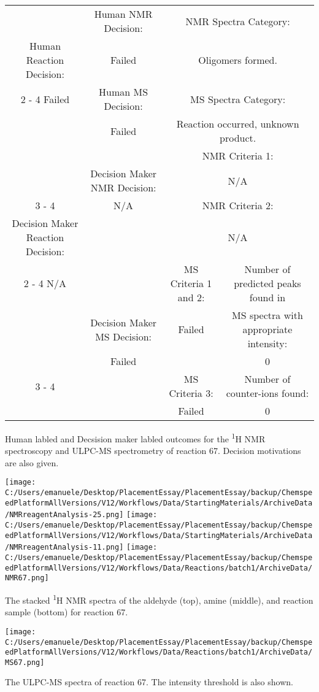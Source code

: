 \documentclass{article}%
\begin{document}
\begin{Decision Table}[H]%
\begin{tabular}{|c|c|c|c|}%
\hline%
&Human NMR Decision:&\multicolumn{2}{|c|}{NMR Spectra Category:}\\%
Human Reaction Decision:&Failed&\multicolumn{2}{|c|}{Oligomers formed.}\\%
\cline{2%
-%
4}%
Failed&Human MS Decision:&\multicolumn{2}{|c|}{MS Spectra Category:}\\%
&Failed&\multicolumn{2}{|c|}{Reaction occurred, unknown product.}\\%
\hline%
&&\multicolumn{2}{|c|}{NMR Criteria 1:}\\%
&Decision Maker NMR Decision:&\multicolumn{2}{|c|}{N/A}\\%
\cline{3%
-%
4}%
&N/A&\multicolumn{2}{|c|}{NMR Criteria 2:}\\%
Decision Maker Reaction Decision:&&\multicolumn{2}{|c|}{N/A}\\%
\cline{2%
-%
4}%
N/A&&MS Criteria 1 and 2:&Number of predicted peaks found in\\%
&Decision Maker MS Decision:&Failed&MS spectra with appropriate intensity:\\%
&Failed&&0\\%
\cline{3%
-%
4}%
&&MS Criteria 3:&Number of counter{-}ions found:\\%
&&Failed&0\\%
\hline%
\end{tabular}%
\caption{Human labled and Decsision maker labled outcomes for the \textsuperscript{1}H NMR spectroscopy and ULPC-MS spectrometry of reaction 67. Decision motivations are also given.}%
\end{Decision Table}%
\begin{NMR Spectra}[H]%
\begin{center}%
\texttt{[image: C:/Users/emanuele/Desktop/PlacementEssay/PlacementEssay/backup/ChemspeedPlatformAllVersions/V12/Workflows/Data/StartingMaterials/ArchiveData/NMRreagentAnalysis-25.png]}\hfill%
\texttt{[image: C:/Users/emanuele/Desktop/PlacementEssay/PlacementEssay/backup/ChemspeedPlatformAllVersions/V12/Workflows/Data/StartingMaterials/ArchiveData/NMRreagentAnalysis-11.png]}\hfill%
\texttt{[image: C:/Users/emanuele/Desktop/PlacementEssay/PlacementEssay/backup/ChemspeedPlatformAllVersions/V12/Workflows/Data/Reactions/batch1/ArchiveData/NMR67.png]}\hfill%
\end{center}%
\caption{The stacked \textsuperscript{1}H NMR spectra of the aldehyde (top), amine (middle), and reaction sample (bottom) for reaction 67.}%
\end{NMR Spectra}%
\begin{MS Spectra}[H]%
\begin{center}%
\texttt{[image: C:/Users/emanuele/Desktop/PlacementEssay/PlacementEssay/backup/ChemspeedPlatformAllVersions/V12/Workflows/Data/Reactions/batch1/ArchiveData/MS67.png]}\hfill%
\end{center}%
\caption{The ULPC-MS spectra of reaction 67. The intensity threshold is also shown.}%
\end{MS Spectra}%
\end{document}
